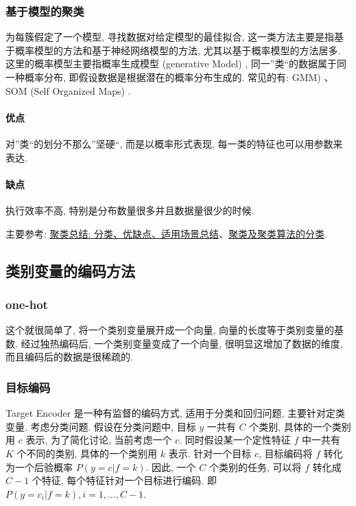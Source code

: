 \subsubsection{基于模型的聚类}
为每簇假定了一个模型, 寻找数据对给定模型的最佳拟合, 这一类方法主要是指基于概率模型的方法和基于神经网络模型的方法, 尤其以基于概率模型的方法居多. 这里的概率模型主要指概率生成模型 (generative Model) , 同一”类“的数据属于同一种概率分布, 即假设数据是根据潜在的概率分布生成的. 常见的有: GMM) 、SOM (Self Organized Maps) . 

\paragraph{优点}对”类“的划分不那么”坚硬“, 而是以概率形式表现, 每一类的特征也可以用参数来表达. 

\paragraph{缺点}执行效率不高, 特别是分布数量很多并且数据量很少的时候. 

主要参考: \href{https://blog.csdn.net/weixin_45440065/article/details/106358007}{聚类总结: 分类、优缺点、适用场景总结}、\href{https://blog.csdn.net/count_on_me/article/details/82193745}{聚类及聚类算法的分类}. 

\subsection{类别变量的编码方法}
\subsubsection{one-hot}
这个就很简单了, 将一个类别变量展开成一个向量, 向量的长度等于类别变量的基数. 经过独热编码后, 一个类别变量变成了一个向量, 很明显这增加了数据的维度, 而且编码后的数据是很稀疏的. 

\subsubsection{目标编码}
Target Encoder 是一种有监督的编码方式, 适用于分类和回归问题, 主要针对定类变量. 考虑分类问题. 假设在分类问题中, 目标 $y$  一共有 $C$ 个类别, 具体的一个类别用 $c$ 表示, 为了简化讨论, 当前考虑一个 $c$. 同时假设某一个定性特征 $f$ 中一共有 $K$ 个不同的类别, 具体的一个类别用 $k$ 表示. 针对一个目标 $c$, 目标编码将 $f$ 转化为一个后验概率 $P(y = c | f=k)$. 因此, 一个 $C$ 个类别的任务, 可以将 $f$ 转化成 $C-1$ 个特征, 每个特征针对一个目标进行编码. 即 $P(y=c_i | f=k), i=1, ..., C-1$. 

